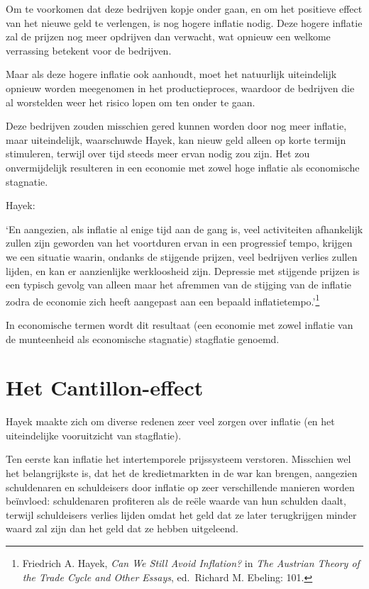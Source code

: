 \documentclass[
  a5paper,
  smalldemyvopaper,11pt,twoside,onecolumn,openright,extrafontsizes,
hidelinks]{memoir}
\renewenvironment{quote}%
               {\list{}{\rightmargin=.3cm\leftmargin=.3cm}%
                \itshape \item[]}%
               {\endlist}
\begin{document}
Om te voorkomen dat deze bedrijven kopje onder gaan, en om het positieve
effect van het nieuwe geld te verlengen, is nog hogere inflatie nodig.
Deze hogere inflatie zal de prijzen nog meer opdrijven dan verwacht, wat
opnieuw een welkome verrassing betekent voor de bedrijven.

Maar als deze hogere inflatie ook aanhoudt, moet het natuurlijk
uiteindelijk opnieuw worden meegenomen in het productieproces, waardoor
de bedrijven die al worstelden weer het risico lopen om ten onder te
gaan.

Deze bedrijven zouden misschien gered kunnen worden door nog meer
inflatie, maar uiteindelijk, waarschuwde Hayek, kan nieuw geld alleen op
korte termijn stimuleren, terwijl over tijd steeds meer ervan nodig zou
zijn. Het zou onvermijdelijk resulteren in een economie met zowel hoge
inflatie als economische stagnatie.

Hayek:

\begin{quote}
`En aangezien, als inflatie al enige tijd aan de gang is, veel
activiteiten afhankelijk zullen zijn geworden van het voortduren ervan
in een progressief tempo, krijgen we een situatie waarin, ondanks de
stijgende prijzen, veel bedrijven verlies zullen lijden, en kan er
aanzienlijke werkloosheid zijn. Depressie met stijgende prijzen is een
typisch gevolg van alleen maar het afremmen van de stijging van de
inflatie zodra de economie zich heeft aangepast aan een bepaald
inflatietempo.'\footnote{\hspace{0pt}Friedrich A. Hayek, \emph{Can We
  Still Avoid Inflation?} in \emph{The Austrian Theory of the Trade
  Cycle and Other Essays}, ed.~Richard M. Ebeling: 101.}
\end{quote}

In economische termen wordt dit resultaat (een economie met zowel
inflatie van de munteenheid als economische stagnatie) stagflatie
genoemd.

\section{Het Cantillon-effect}\label{het-cantillon-effect}

Hayek maakte zich om diverse redenen zeer veel zorgen over inflatie (en
het uiteindelijke vooruitzicht van stagflatie).

Ten eerste kan inflatie het intertemporele prijssysteem verstoren.
Misschien wel het belangrijkste is, dat het de kredietmarkten in de war
kan brengen, aangezien schuldenaren en schuldeisers door inflatie op
zeer verschillende manieren worden beïnvloed: schuldenaren profiteren
als de reële waarde van hun schulden daalt, terwijl schuldeisers verlies
lijden omdat het geld dat ze later terugkrijgen minder waard zal zijn
dan het geld dat ze hebben uitgeleend.
\end{document}
